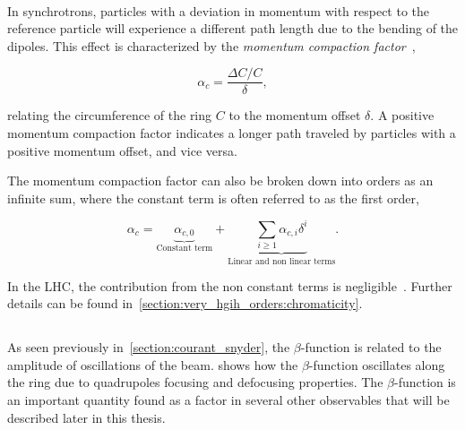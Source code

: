 \FloatBarrier

\paragraph{}
\label{subsection:coordinates_systems:momentum_compaction_factor}

In synchrotrons, particles with a deviation in momentum with respect to the reference particle will
experience a different path length due to the bending of the dipoles. This effect is characterized
by the \textit{momentum compaction factor}~\cite{wiedemann_particle_2015},

\begin{equation}
    \alpha_c = \frac{\Delta C / C}{\delta},
\end{equation}

relating the circumference of the ring $C$ to the momentum offset $\delta$.
A positive momentum compaction factor indicates a longer path traveled by particles with a positive
momentum offset, and vice versa.


The momentum compaction factor can also be broken down into orders as an infinite sum, where the
constant term is often referred to as the first order,

\begin{equation}
    \alpha_c = \underbrace{\alpha_{c,0}}_{\text{Constant term}}
               + \underbrace{\sum_{i \geq 1} \alpha_{c, i} \delta^i}_\text{Linear and non linear terms}.
\end{equation}

In the LHC, the contribution from the non constant terms is
negligible~\cite{keintzel_jacqueline_beam_2022}. Further details can be found
in~\cref{section:very_hgih_orders:chromaticity}.

\FloatBarrier

\subsection{}

As seen previously in~\cref{section:courant_snyder}, the $\beta$-function is related to the amplitude
of oscillations of the beam.  shows how the $\beta$-function
oscillates along the ring due to quadrupoles focusing and defocusing properties.
The $\beta$-function is an important quantity found as a factor in several other observables that
will be described later in this thesis.


